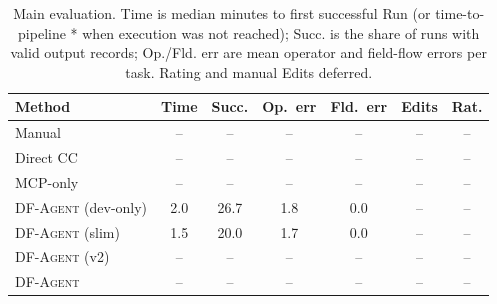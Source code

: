 \begin{table}[t]
\centering
\small
\setlength{\tabcolsep}{3pt}
\begin{tabular}{lcccccc}
\toprule
Method & Time & Succ. & Op.\ err & Fld.\ err & Edits & Rat. \\
\midrule
Manual & -- & -- & -- & -- & -- & -- \\
Direct CC & -- & -- & -- & -- & -- & -- \\
MCP-only & -- & -- & -- & -- & -- & -- \\
\textsc{DF-Agent} (dev-only) & 2.0 & 26.7 & 1.8 & 0.0 & -- & -- \\
\textsc{DF-Agent} (slim) & 1.5 & 20.0 & 1.7 & 0.0 & -- & -- \\
\textsc{DF-Agent} (v2) & -- & -- & -- & -- & -- & -- \\
\textsc{DF-Agent} & -- & -- & -- & -- & -- & -- \\
\bottomrule
\end{tabular}
\caption{Main evaluation. Time is median minutes to first successful Run (or time-to-pipeline * when execution was not reached); Succ. is the share of runs with valid output records; Op./Fld. err are mean operator and field-flow errors per task. Rating and manual Edits deferred.}
\label{tab:eval}
\end{table}
